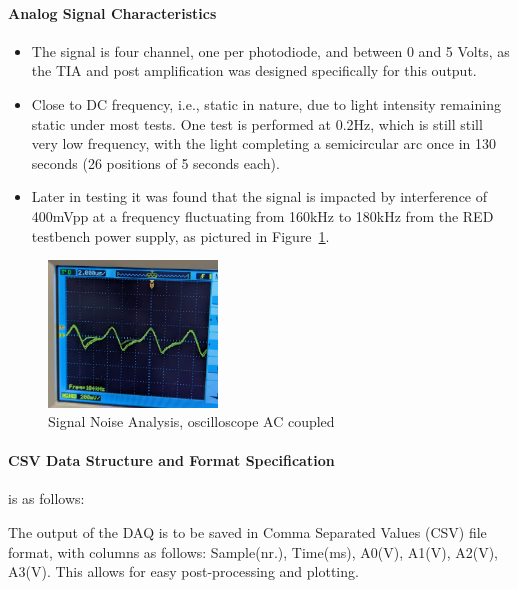 \paragraph{Analog Signal Characteristics}
\begin{itemize}
    \item The signal is four channel, one per photodiode, and between 0 and 5 Volts, as the TIA and post amplification was designed specifically for this output.
    \item Close to DC frequency, i.e., static in nature, due to light intensity remaining static under most tests. One test is performed at 0.2Hz, which is still still very low frequency, with the light completing a semicircular arc once in 130 seconds (26 positions of 5 seconds each). 
    \item Later in testing it was found that the signal is impacted by interference of 400mVpp at a frequency fluctuating from 160kHz to 180kHz from the RED testbench power supply, as pictured in Figure~\ref{fig:sigNoise}.
\end{itemize}
\begin{figure}[htbp] 
    \centering
    \includegraphics[width=0.4\textwidth]{chapters/methodology/ArduinoDAQ/signal_noise.png}
    \caption{Signal Noise Analysis, oscilloscope AC coupled}
    \label{fig:sigNoise}
\end{figure}
%
%
\paragraph{CSV Data Structure and Format Specification}is as follows:

The output of the DAQ is to be saved in Comma Separated Values (CSV) file format, with columns as follows: Sample(nr.), Time(ms), A0(V), A1(V), A2(V), A3(V). This allows for easy post-processing and plotting.
